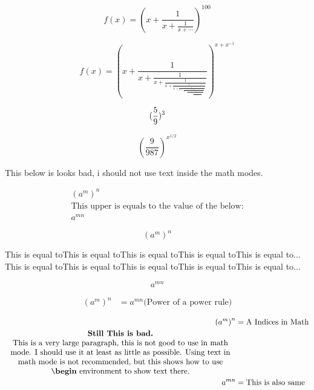 \documentclass[12pt, letterpaper]{article}
\begin{document}
\[
f(x) = \left( x + \frac{1}{x + \frac{1}{x + \cdots}} \right) ^ {100}
\]

\[
f(x) = \left( x + \frac{1}{x + 
         \frac{1}{x + 
         \frac{1}{x + 
         \frac{1}{x + 
         \frac{1}{x + 
         \frac{1}{x + 
         \frac{1}{x + 
         \frac{1}{x + 
         \frac{1}{x + 
         \frac{1}{x + 
         \frac{1}{x + 
         \frac{1}{x + 
         \frac{1}{x + 
         \frac{1}{x + 
         \frac{1}{x
         }}}}}}}}}}}}}}}
         \right) ^ {x + x^{-1}}
\]


$$
(\frac5{9})^3 \\
$$

\[
\left(\frac9{987}\right)^{ x^{1/2}}
\]


This below is looks bad, i should not use text inside the math modes.

\[
\begin{aligned}
    \left(a^m\right)^n \\
    \text{This upper is equals to the value of the below:} \\
    a^{mn}
\end{aligned}
\]



\[
\left(a^m\right)^n
\]

\noindent 
This is equal toThis is equal toThis is equal toThis is equal toThis is equal to...
This is equal toThis is equal toThis is equal toThis is equal toThis is equal to...

\[
a^{mn}
\]





\begin{align*}
\left(a^m\right)^n &= a^{mn}  \text{(Power of a power rule)} 
\end{align*}





\[
\begin{aligned}
    \left(a^m\right)^n &= \text{A Indices in Math} \\
    \parbox{0.85\linewidth}{
        \centering 
        \textbf{Still This is bad.} \\
        This is a very large paragraph, this is not good to use in math mode. I should use it at least as little as possible. Using text in math mode is not recommended, but this shows how to use \text{\texttt{\char`\\}\textbf{begin}} environment to show text there.
    } & \\
    a^{mn} &= \text{This is also same} 
\end{aligned}
\]
\end{document}
